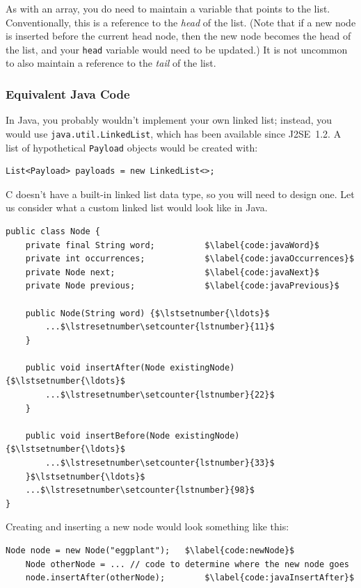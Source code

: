 As with an array, you do need to maintain a variable that points to the list.
Conventionally, this is a reference to the \textit{head} of the list. (Note that if a new node is inserted before the current head node, then the new node becomes the head of the list, and your \lstinline{head} variable would need to be updated.)
It is not uncommon to also maintain a reference to the \textit{tail} of the list.

\subsubsection{Equivalent Java Code}

In Java, you probably wouldn't implement your own linked list;
instead, you would use \lstinline{java.util.LinkedList}, which has been available since J2SE~1.2.
A list of hypothetical \lstinline{Payload} objects would be created with:
\begin{lstlisting}[numbers=none]
    List<Payload> payloads = new LinkedList<>;
\end{lstlisting}

C doesn't have a built-in linked list data type, so you will need to design one.
Let us consider what a custom linked list would look like in Java.

\begin{lstlisting}[mathescape=true]
public class Node {
    private final String word;          $\label{code:javaWord}$
    private int occurrences;            $\label{code:javaOccurrences}$
    private Node next;                  $\label{code:javaNext}$
    private Node previous;              $\label{code:javaPrevious}$

    public Node(String word) {$\lstsetnumber{\ldots}$
        ...$\lstresetnumber\setcounter{lstnumber}{11}$
    }

    public void insertAfter(Node existingNode) {$\lstsetnumber{\ldots}$
        ...$\lstresetnumber\setcounter{lstnumber}{22}$
    }

    public void insertBefore(Node existingNode) {$\lstsetnumber{\ldots}$
        ...$\lstresetnumber\setcounter{lstnumber}{33}$
    }$\lstsetnumber{\ldots}$
    ...$\lstresetnumber\setcounter{lstnumber}{98}$
}
\end{lstlisting}

Creating and inserting a new node would look something like this:

\begin{lstlisting}[firstnumber=200, mathescape=true]
    Node node = new Node("eggplant");   $\label{code:newNode}$
    Node otherNode = ... // code to determine where the new node goes
    node.insertAfter(otherNode);        $\label{code:javaInsertAfter}$
\end{lstlisting}

